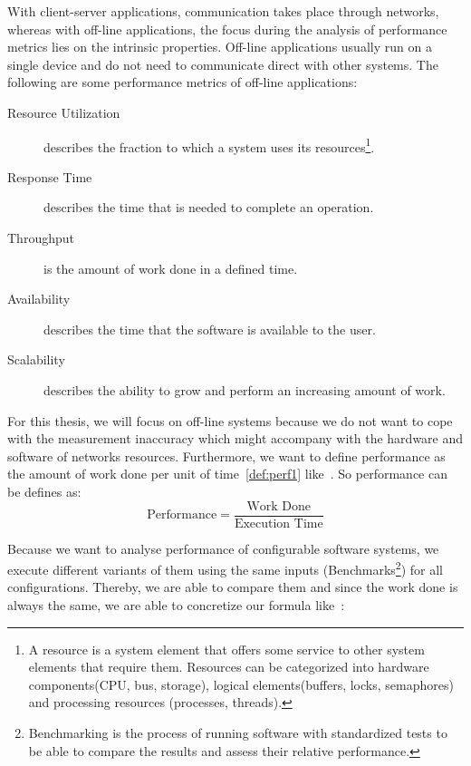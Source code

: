 With client-server applications, communication takes place through networks, whereas with off-line applications, the focus during the analysis of performance metrics lies on the intrinsic properties.
Off-line applications usually run on a single device and do not need to communicate direct with other systems. 
The following are some performance metrics of off-line applications:

\begin{description}
	\item [Resource Utilization] describes the fraction to which a system uses its resources\footnote{A resource is a system element that offers some service to other system elements that require them. Resources can be categorized into hardware components(CPU, bus, storage), logical elements(buffers, locks, semaphores) and processing resources (processes, threads)\cite{woodside2007future}.}.
	\item [Response Time] describes the time that is needed to complete an operation.
	\item [Throughput] is the amount of work done in a defined time.
	\item [Availability] describes the time that the software is available to the user.
	\item [Scalability] describes the ability to grow and perform an increasing amount of work. 
\end{description}

For this thesis, we will focus on off-line systems because we do not want to cope with the measurement inaccuracy which might accompany with the hardware and software of networks resources. 
Furthermore, we want to define performance as the amount of work done per unit of time~\ref{def:perf1} like~\cite{tsirogiannis2010analyzing}. 
So performance can be defines as:
\begin{equation}
	\label{def:perf1}
	\mbox{Performance}=\frac{\mbox{Work Done}}{\mbox{Execution Time}}
\end{equation}

Because we want to analyse performance of configurable software systems, we execute different variants of them using the same inputs (Benchmarks\footnote{Benchmarking is the process of running software with standardized tests to be able to compare the results and assess their relative performance.}) for all configurations. 
Thereby, we are able to compare them and since the \textsf{work done} is always the same, we are able to concretize our formula like~\cite{siegmund2015performance}:

